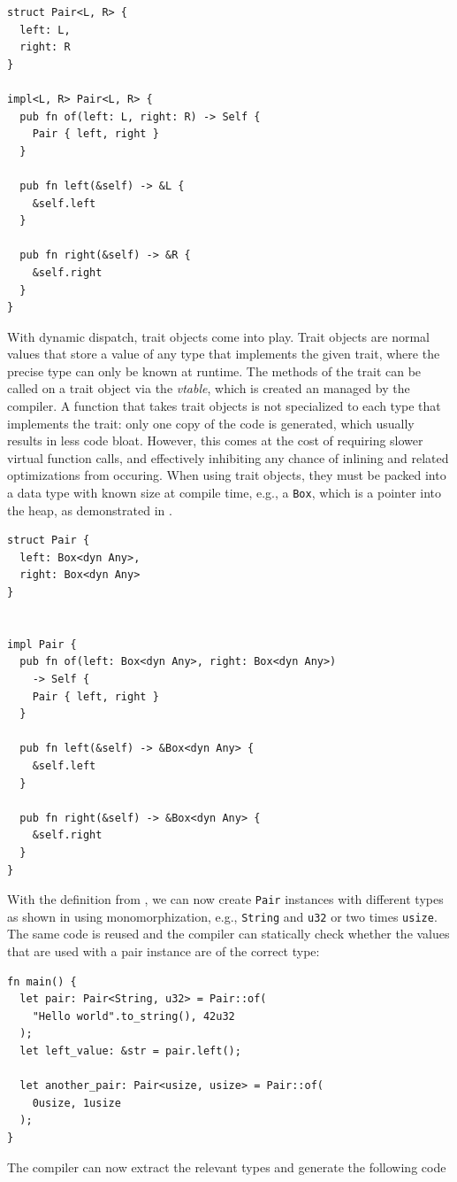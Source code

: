 \documentclass[paper=a4,%
  twoside,%
  BCOR4mm,%
  abstract=true,%
  toc=bibliography,%
  chapterprefix=true,%
  toc=bibliographynumbered,%
  open=right,%
  english,%
  pagesize=pdftex]{scrreprt}
\begin{document}
\begin{lstlisting}[style=boxed, caption={A data type with static dispatch via monomorphization}, label=lst:static-dispatch]
struct Pair<L, R> {
  left: L,
  right: R
}

impl<L, R> Pair<L, R> {
  pub fn of(left: L, right: R) -> Self {
    Pair { left, right }
  }

  pub fn left(&self) -> &L {
    &self.left
  }

  pub fn right(&self) -> &R {
    &self.right
  }
}
\end{lstlisting}

With dynamic dispatch, trait objects come into play. Trait objects are normal values that store a value of any type that implements the given trait, where the precise type can only be known at runtime. The methods of the trait can be called on a trait object via the \textit{vtable}, which is created an managed by the compiler. A function that takes trait objects is not specialized to each type that implements the trait: only one copy of the code is generated, which usually results in less code bloat. However, this comes at the cost of requiring slower virtual function calls, and effectively inhibiting any chance of inlining and related optimizations from occuring. When using trait objects, they must be packed into a data type with known size at compile time, e.g., a \texttt{Box}, which is a pointer into the heap, as demonstrated in .

\begin{lstlisting}[style=boxed, caption=A data type with dynamic dispatch, label=lst:dynamic-dispatch]
struct Pair {
  left: Box<dyn Any>,
  right: Box<dyn Any>
}


impl Pair {
  pub fn of(left: Box<dyn Any>, right: Box<dyn Any>)
    -> Self {
    Pair { left, right }
  }

  pub fn left(&self) -> &Box<dyn Any> {
    &self.left
  }

  pub fn right(&self) -> &Box<dyn Any> {
    &self.right
  }
}
\end{lstlisting}

With the definition from , we can now create \texttt{Pair} instances with different types as shown in  using monomorphization, e.g., \texttt{String} and \texttt{u32} or two times \texttt{usize}. The same code is reused and the compiler can statically check whether the values that are used with a pair instance are of the correct type:
\begin{lstlisting}[style=boxed, caption={}, label=lst:example-generics-usage]
fn main() {
  let pair: Pair<String, u32> = Pair::of(
    "Hello world".to_string(), 42u32
  );
  let left_value: &str = pair.left();

  let another_pair: Pair<usize, usize> = Pair::of(
    0usize, 1usize
  );
}
\end{lstlisting}
The compiler can now extract the relevant types and generate the following code
\end{document}
